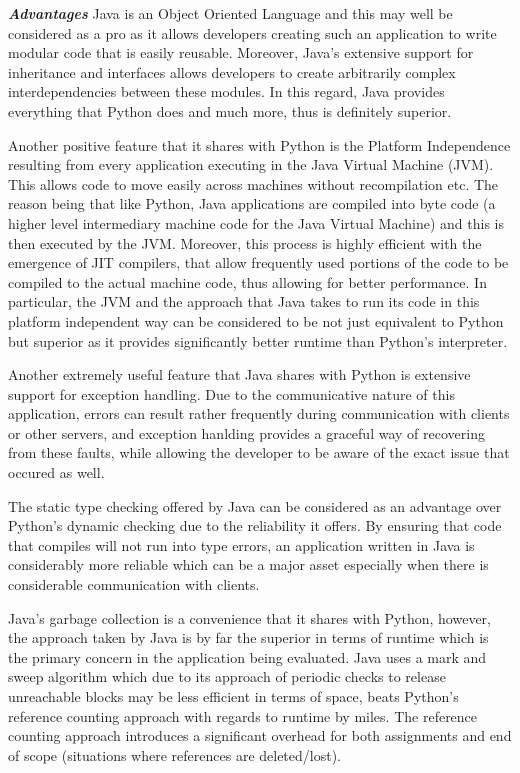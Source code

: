 \textbf{\textit{Advantages}}\newline
Java is an Object Oriented Language and this may well be considered as a pro as it allows developers creating such an application to write modular code that is easily reusable. Moreover, Java's extensive support for inheritance and interfaces allows developers to create arbitrarily complex interdependencies between these modules. In this regard, Java provides everything that Python does and much more, thus is definitely superior. \newline

\noindent Another positive feature that it shares with Python is the Platform Independence resulting from every application executing in the Java Virtual Machine (JVM). This allows code to move easily across machines without recompilation etc. The reason being that like Python, Java applications are compiled into byte code (a higher level intermediary machine code for the Java Virtual Machine) and this is then executed by the JVM. Moreover, this process is highly efficient with the emergence of JIT compilers, that allow frequently used portions of the code to be compiled to the actual machine code, thus allowing for better performance. In particular, the JVM and the approach that Java takes to run its code in this platform independent way can be considered to be not just equivalent to Python but superior as it provides significantly better runtime than Python's interpreter. \newline

\noindent Another extremely useful feature that Java shares with Python is extensive support for exception handling. Due to the communicative nature of this application, errors can result rather frequently during communication with clients or other servers, and exception hanlding provides a graceful way of recovering from these faults, while allowing the developer to be aware of the exact issue that occured as well. \newline

\noindent The static type checking offered by Java can be considered as an advantage over Python's dynamic checking due to the reliability it offers. By ensuring that code that compiles will not run into type errors, an application written in Java is considerably more reliable which can be a major asset especially when there is considerable communication with clients. \newline

\noindent Java's garbage collection is a convenience that it shares with Python, however, the approach taken by Java is by far the superior in terms of runtime which is the primary concern in the application being evaluated. Java uses a mark and sweep algorithm which due to its approach of periodic checks to release unreachable blocks may be less efficient in terms of space, beats Python's reference counting approach with regards to runtime by miles. The reference counting approach introduces a significant overhead for both assignments and end of scope (situations where references are deleted/lost). \newline

